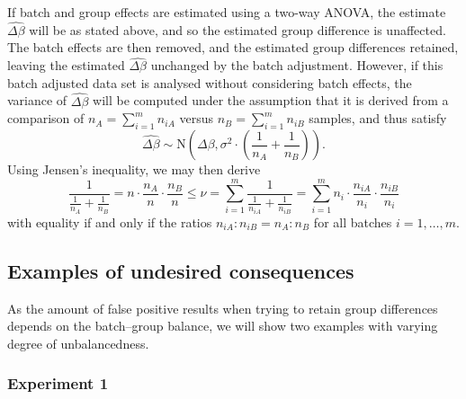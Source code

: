 \documentclass{bio}
\begin{document}
If batch and group effects are estimated using a two-way ANOVA, the estimate $\widehat{\Delta\beta}$ will be as stated above, and so the estimated group difference is unaffected. The batch effects are then removed, and the estimated group differences retained, leaving the estimated $\widehat{\Delta\beta}$ unchanged by the batch adjustment. However, if this batch adjusted data set is analysed without considering batch effects, the variance of $\widehat{\Delta\beta}$ will be computed under the assumption that it is derived from a comparison of $n_A=\sum_{i=1}^m n_{iA}$ versus $n_B=\sum_{i=1}^m n_{iB}$ samples, and thus satisfy
\begin{equation}
\widehat{\Delta\beta}
\sim\text{N}\left(\Delta\beta,\sigma^2\cdot\left(\frac{1}{n_A}+\frac{1}{n_B}\right)\right).
\end{equation}
Using Jensen's inequality, we may then derive
\begin{equation}
\frac{1}{\frac{1}{n_A}+\frac{1}{n_B}}=n\cdot\frac{n_A}{n}\cdot\frac{n_B}{n}
\le
\nu
=\sum_{i=1}^m \frac{1}{\frac{1}{n_{iA}}+\frac{1}{n_{iB}}}
=\sum_{i=1}^m n_i\cdot\frac{n_{iA}}{n_i}\cdot\frac{n_{iB}}{n_i}
\end{equation}
with equality if and only if the ratios $n_{iA}:n_{iB}=n_A:n_B$ for all batches $i=1,\ldots,m$.



\subsection{Examples of undesired consequences}

As the amount of false positive results when trying to retain group differences depends on the batch--group balance, we will show two examples with varying degree of unbalancedness. 

\subsubsection{Experiment 1}
\end{document}
